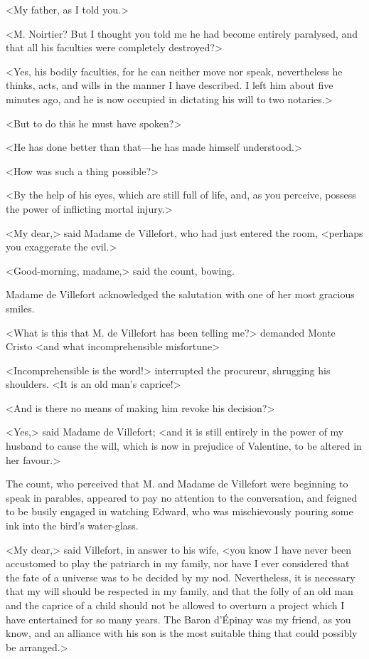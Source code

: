 <My father, as I told you.> 

 <M. Noirtier? But I thought you told me he had become entirely paralysed, and that all his faculties were completely destroyed?> 

 <Yes, his bodily faculties, for he can neither move nor speak, nevertheless he thinks, acts, and wills in the manner I have described. I left him about five minutes ago, and he is now occupied in dictating his will to two notaries.> 

 <But to do this he must have spoken?> 

 <He has done better than that—he has made himself understood.> 

 <How was such a thing possible?> 

 <By the help of his eyes, which are still full of life, and, as you perceive, possess the power of inflicting mortal injury.> 

 <My dear,> said Madame de Villefort, who had just entered the room, <perhaps you exaggerate the evil.> 

 <Good-morning, madame,> said the count, bowing. 

 

 Madame de Villefort acknowledged the salutation with one of her most gracious smiles. 

 <What is this that M. de Villefort has been telling me?> demanded Monte Cristo <and what incomprehensible misfortune\longdash> 

 <Incomprehensible is the word!> interrupted the procureur, shrugging his shoulders. <It is an old man's caprice!> 

 <And is there no means of making him revoke his decision?> 

 <Yes,> said Madame de Villefort; <and it is still entirely in the power of my husband to cause the will, which is now in prejudice of Valentine, to be altered in her favour.> 

 The count, who perceived that M. and Madame de Villefort were beginning to speak in parables, appeared to pay no attention to the conversation, and feigned to be busily engaged in watching Edward, who was mischievously pouring some ink into the bird's water-glass. 

 <My dear,> said Villefort, in answer to his wife, <you know I have never been accustomed to play the patriarch in my family, nor have I ever considered that the fate of a universe was to be decided by my nod. Nevertheless, it is necessary that my will should be respected in my family, and that the folly of an old man and the caprice of a child should not be allowed to overturn a project which I have entertained for so many years. The Baron d'Épinay was my friend, as you know, and an alliance with his son is the most suitable thing that could possibly be arranged.> 

